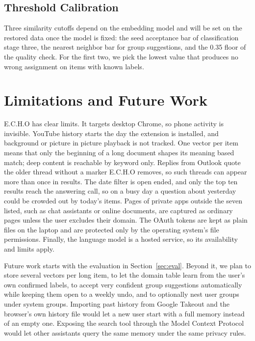 \documentclass[conference]{IEEEtran}
\begin{document}
\subsection{Threshold Calibration}
Three similarity cutoffs depend on the embedding model and will be set on the restored data once the model is fixed: the seed acceptance bar of classification stage three, the nearest neighbor bar for group suggestions, and the 0.35 floor of the quality check. For the first two, we pick the lowest value that produces no wrong assignment on items with known labels.

\section{Limitations and Future Work}\label{sec:limits}
E.C.H.O has clear limits. It targets desktop Chrome, so phone activity is invisible. YouTube history starts the day the extension is installed, and background or picture in picture playback is not tracked. One vector per item means that only the beginning of a long document shapes its meaning based match; deep content is reachable by keyword only. Replies from Outlook quote the older thread without a marker E.C.H.O removes, so such threads can appear more than once in results. The date filter is open ended, and only the top ten results reach the answering call, so on a busy day a question about yesterday could be crowded out by today's items. Pages of private apps outside the seven listed, such as chat assistants or online documents, are captured as ordinary pages unless the user excludes their domain. The OAuth tokens are kept as plain files on the laptop and are protected only by the operating system's file permissions. Finally, the language model is a hosted service, so its availability and limits apply.

Future work starts with the evaluation in Section~\ref{sec:eval}. Beyond it, we plan to store several vectors per long item, to let the domain table learn from the user's own confirmed labels, to accept very confident group suggestions automatically while keeping them open to a weekly undo, and to optionally nest user groups under system groups. Importing past history from Google Takeout and the browser's own history file would let a new user start with a full memory instead of an empty one. Exposing the search tool through the Model Context Protocol would let other assistants query the same memory under the same privacy rules.
\end{document}
